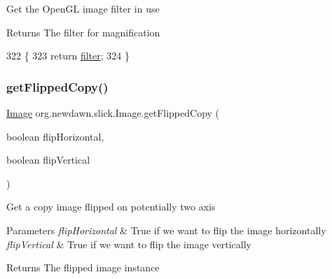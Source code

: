 Get the Open\+GL image filter in use

\begin{DoxyReturn}{Returns}
The filter for magnification 
\end{DoxyReturn}

\begin{DoxyCode}
322                            \{
323         \textcolor{keywordflow}{return} \mbox{\hyperlink{classorg_1_1newdawn_1_1slick_1_1_image_a1c6f09687817420f3762f32bb1c3ed76}{filter}};
324     \}
\end{DoxyCode}
\mbox{\label{classorg_1_1newdawn_1_1slick_1_1_image_a60ce67f944bd70ef4ed9716974db74f1}} 
\subsubsection{\texorpdfstring{get\+Flipped\+Copy()}{getFlippedCopy()}}
{\footnotesize\ttfamily \mbox{\hyperlink{classorg_1_1newdawn_1_1slick_1_1_image}{Image}} org.\+newdawn.\+slick.\+Image.\+get\+Flipped\+Copy (\begin{DoxyParamCaption}\item[{boolean}]{flip\+Horizontal,  }\item[{boolean}]{flip\+Vertical }\end{DoxyParamCaption})\hspace{0.3cm}{\ttfamily [inline]}}

Get a copy image flipped on potentially two axis


\begin{DoxyParams}{Parameters}
{\em flip\+Horizontal} & True if we want to flip the image horizontally \\
\hline
{\em flip\+Vertical} & True if we want to flip the image vertically \\
\hline
\end{DoxyParams}
\begin{DoxyReturn}{Returns}
The flipped image instance 
\end{DoxyReturn}


